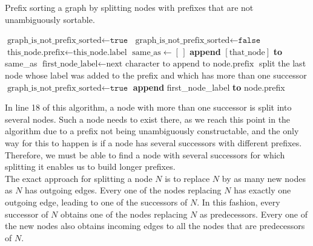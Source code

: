 \documentclass[a4paper,12pt,twoside,BCOR=10mm]{scrbook}
\begin{document}
\begin{algorithm}
\caption[Prefix sorting a graph]{Prefix sorting a graph by splitting nodes with prefixes that are not unambiguously sortable.}
\label{alg:workOnAutomatonPrefixes}
\begin{algorithmic}[1]
\State $ \textrm{graph\_is\_not\_prefix\_sorted} \gets \texttt{true} $
	\State $ \textrm{graph\_is\_not\_prefix\_sorted} \gets \texttt{false} $
		\State $ \textrm{this\_node.prefix} \gets \textrm{this\_node.label} $
	\EndFor
		\State $ \textrm{same\_as} \gets [ \, ] $
				\State \textbf{append} $ [\textrm{that\_node}] $ \textbf{to} same\_as
			\EndIf
		\EndFor
				\State $ \textrm{first\_node\_label} \gets \textrm{next character to append to node.prefix} $
					\State split the last node whose label was added to the prefix and which
						\State \phantom{first} has more than one successor
					\State $ \textrm{graph\_is\_not\_prefix\_sorted} \gets \texttt{true} $
				\Else
					\State \textbf{append} first\_node\_label \textbf{to} node.prefix
				\EndIf
			\EndFor
		\EndIf
	\EndFor
\EndWhile
\end{algorithmic}
\end{algorithm}
In line 18 of this algorithm, a node with more than one successor is split into several nodes. 
Such a node needs to exist there, as we reach this point in the algorithm due to a prefix 
not being unambiguously constructable, and the only way for this to happen is if a node has 
several successors with different prefixes. Therefore, we must be able to find a node with 
several successors for which splitting it enables us to build longer prefixes. \\
The exact approach for splitting a node $ N $ is to replace $ N $ by as many new nodes as $ N $ has 
outgoing edges. 
Every one of the nodes replacing $ N $ has exactly one outgoing edge, leading to 
one of the successors of $ N $. 
In this fashion, every successor of $ N $ obtains one of the nodes replacing $ N $ as predecessors. 
Every one of the new nodes also obtains incoming edges to all the nodes that are predecessors of $ N $. 
\end{document}
